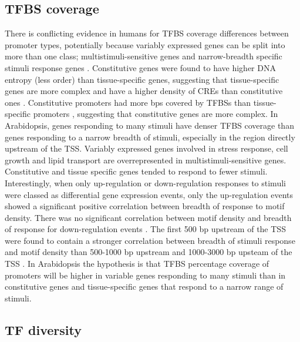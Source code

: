 \documentclass[../main.tex]{subfiles}
\begin{document}
\subsection{TFBS coverage}
\label{chapter1:introduction:tfbs-coverage}

There is conflicting evidence in humans for TFBS coverage differences between promoter types, potentially because variably expressed genes can be split into more than one class; multistimuli-sensitive genes and narrow-breadth specific stimuli response genes \autocite{waltherRegulatoryCodeTranscriptional2007}.
Constitutive genes were found to have higher DNA entropy (less order) than tissue-specific genes, suggesting that tissue-specific genes are more complex and have a higher density of CREs than constitutive ones \autocite{thomasDNAEntropyReveals2015}. 
Constitutive promoters had more bps covered by TFBSs than tissue-specific promoters \autocite{mattioliHighthroughputFunctionalAnalysis2019}, suggesting that constitutive genes are more complex.
In Arabidopsis, genes responding to many stimuli have denser TFBS coverage than genes responding to a narrow breadth of stimuli, especially in the region directly upstream of the TSS.
Variably expressed genes involved in stress response, cell growth and lipid transport are overrepresented in multistimuli-sensitive genes.
Constitutive and tissue specific genes tended to respond to fewer stimuli.
Interestingly, when only up-regulation or down-regulation responses to stimuli were classed as differential gene expression events, only the up-regulation events showed a significant positive correlation between breadth of response to motif density.
There was no significant correlation between motif density and breadth of response for down-regulation events \autocite{waltherRegulatoryCodeTranscriptional2007}.
The first 500 bp upstream of the TSS were found to contain a stronger correlation between breadth of stimuli response and motif density than 500-1000 bp upstream and 1000-3000 bp upsteam of the TSS \autocite{waltherRegulatoryCodeTranscriptional2007}.
In Arabidopsis the hypothesis is that TFBS percentage coverage of promoters will be higher in variable genes responding to many stimuli than in constitutive genes and tissue-specific genes that respond to a narrow range of stimuli.

\subsection{TF diversity}
\end{document}
